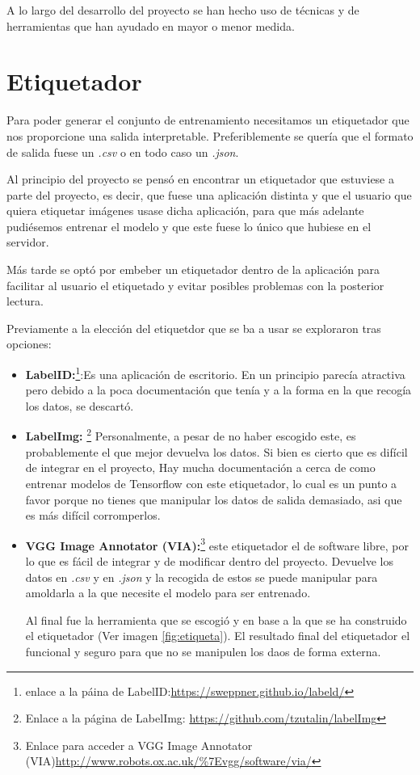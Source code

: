 \label{c.4}

A lo largo del desarrollo del proyecto se han hecho uso de técnicas y de herramientas que han ayudado en mayor o menor medida.

\section{Etiquetador}
Para poder generar el conjunto de entrenamiento necesitamos un etiquetador que nos proporcione una salida interpretable. Preferiblemente se quería que el formato de salida fuese un \textit{.csv} o en todo caso un \textit{.json}. 

Al principio del proyecto se pensó en encontrar un etiquetador que estuviese a parte del proyecto, es decir, que fuese una aplicación distinta y que el usuario que quiera etiquetar imágenes usase dicha aplicación, para que más adelante pudiésemos entrenar el modelo y que este fuese lo único que hubiese en el servidor.

Más tarde se optó por embeber un etiquetador dentro de la aplicación para facilitar al usuario el etiquetado y evitar posibles problemas con la posterior lectura. 

Previamente a la elección del etiquetdor que se ba a usar se exploraron tras opciones:

\begin{itemize}
	\item \textbf{LabelID:}\footnote{enlace a la páina de LabelID:\url{https://sweppner.github.io/labeld/}}:Es una aplicación de escritorio. En un principio parecía atractiva pero debido a la poca documentación que tenía y a la forma en la que recogía los datos, se descartó.

	\item \textbf{LabelImg:} \footnote{Enlace a la página de LabelImg: \url{https://github.com/tzutalin/labelImg}} Personalmente, a pesar de no haber escogido este, es probablemente el que mejor devuelva los datos. Si bien es cierto que es difícil de integrar en el proyecto, Hay mucha documentación a cerca de como entrenar modelos de Tensorflow con este etiquetador, lo cual es un punto a favor porque no tienes que manipular los datos de salida demasiado, asi que es más difícil corromperlos.
	
	\item \textbf{VGG Image Annotator (VIA):}\footnote{Enlace para acceder a VGG Image Annotator (VIA)\url{http://www.robots.ox.ac.uk/\%7Evgg/software/via/}} este etiquetador el de software libre, por lo que es fácil de integrar y de modificar dentro del proyecto. Devuelve los datos en \textit{.csv} y en \textit{.json} y la recogida de estos se puede manipular para amoldarla a la que necesite el modelo para ser entrenado.
	
	Al final fue la herramienta que se escogió y en base a la que se ha construido el etiquetador (Ver imagen \ref{fig:etiqueta}). El resultado final del etiquetador el funcional y seguro para que no se manipulen los daos de forma externa.
	
\end{itemize}

